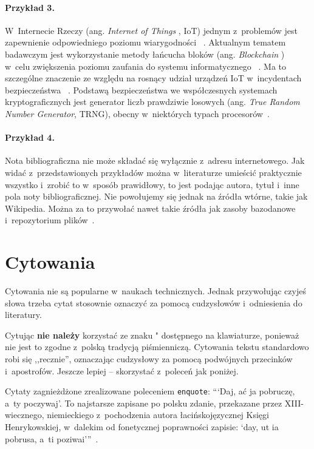 \paragraph{Przykład 3.} W~Internecie Rzeczy (ang. \textit{Internet of Things}
, IoT) jednym z~problemów jest zapewnienie odpowiedniego poziomu wiarygodności~\cite{truong2018}
. Aktualnym tematem badawczym jest wykorzystanie metody łańcucha bloków (ang. \textit{Blockchain}
) w~celu zwiększenia poziomu zaufania do systemu informatycznego~\cite{poirier2020}
. Ma to szczególne znaczenie ze względu na rosnący udział urządzeń IoT w~incydentach bezpieczeństwa~\cite{nask2020}
. Podstawą bezpieczeństwa we współczesnych systemach kryptograficznych jest generator liczb prawdziwie losowych (ang.
\textit{True Random Number Generator}, TRNG), obecny w~niektórych typach procesorów~\cite{AN4230}.

\paragraph{Przykład 4.}
Nota bibliograficzna nie może składać się wyłącznie z~adresu internetowego. Jak widać z~przedstawionych przykładów można
w~literaturze umieścić praktycznie wszystko i~zrobić to w~sposób prawidłowy, to jest podając autora, tytuł i~inne pola
noty bibliograficznej. Nie powołujemy się jednak na źródła wtórne, takie jak Wikipedia. Można za to przywołać nawet
takie źródła jak zasoby bazodanowe i~repozytorium plików~\cite{szablon}.



\section{Cytowania}
Cytowania nie są popularne w~naukach technicznych. Jednak przywołując czyjeś słowa trzeba cytat stosownie oznaczyć za
pomocą cudzysłowów i~odniesienia do literatury.

Cytując \textbf{nie należy}
korzystać ze znaku " dostępnego na klawiaturze, ponieważ nie jest to zgodne z~polską tradycją piśmienniczą. Cytowania
tekstu standardowo robi się ,,recznie'', oznaczając cudzysłowy za pomocą podwójnych przecinków i~apostrofów. Jeszcze
lepiej -- skorzystać z~poleceń jak poniżej.

Cytaty zagnieżdżone zrealizowane poleceniem \texttt{enquote}:
\enquote
{\enquote{Daj, ać ja pobruczę, a~ty poczywaj}. To najstarsze zapisane po polsku zdanie, przekazane przez XIII-wiecznego,
    niemieckiego z~pochodzenia autora łacińskojęzycznej Księgi Henrykowskiej,
    w~dalekim od fonetycznej poprawności zapisie: \enquote{day, ut ia pobrusa, a~ti poziwai}}~\cite{wilamowski2017}.

